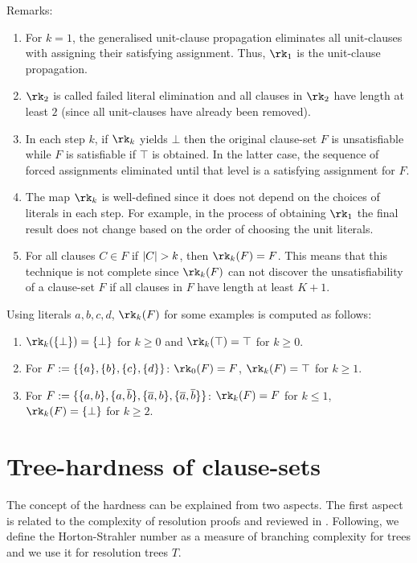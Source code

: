 \documentclass{report}
\begin{document}
Remarks:
\begin{enumerate}
  \item For $k=1$, the generalised unit-clause propagation eliminates all unit-clauses with assigning their satisfying assignment. Thus, $\rk_1$ is the unit-clause propagation.
  \item $\rk_2$ is called failed literal elimination and all clauses in $\rk_2$ have length at least $2$ (since all unit-clauses have already been removed).
  \item In each step $k$, if $\rk_k$ yields $\bot$ then the original clause-set $F$ is unsatisfiable while $F$ is satisfiable if $\top$ is obtained. In the latter case, the sequence of forced assignments eliminated until that level is a satisfying assignment for $F$.
  \item The map $\rk_k$ is well-defined since it does not depend on the choices of literals in each step. For example, in the process of obtaining  $\rk_1$ the final result does not change based on the order of choosing the unit literals. 
  \item For all clauses $C \in F$ if $\lvert C \rvert > k$, then $\rk_k(F) = F$. This means that this technique is not complete since $\rk_k(F)$ can not discover the unsatisfiability of a clause-set $F$ if all clauses in $F$ have length at least $K+1$.
\end{enumerate}

\begin{examp}\label{exp:rk}
Using literals $a,b,c,d$, $\rk_k(F)$ for some examples is computed as follows:
  \begin{enumerate}
  \item $\rk_k(\set{\bot}) = \set{\bot}$ for $k \ge 0$ and $\rk_k(\top) = \top$ for $k \ge 0$.
  \item For $F := \{ \{ a \},\{ b \},\{ c \},\{ d \} \}$: $\rk_0(F) = F$, $\rk_k(F) = \top$ for $k \ge 1$.
  \item For $F := \{ \{ a,b \},\{ a,\overline{b} \}, \{ \overline{a},b \},\{ \overline{a},\overline{b} \} \}$: $\rk_k(F) = F$ for $k \le 1$, $\rk_k(F) = \set{\bot}$ for $k \ge 2$.
  \end{enumerate}
\end{examp}

\section{Tree-hardness of clause-sets}
\label{sec:Hardnessunsat}

The concept of the hardness can be explained from two aspects. The first aspect is related to the complexity of resolution proofs and reviewed in \cite{h8, h18}. Following, we define the Horton-Strahler number as a measure of branching complexity for trees and we use it for resolution trees $T$.
\end{document}
